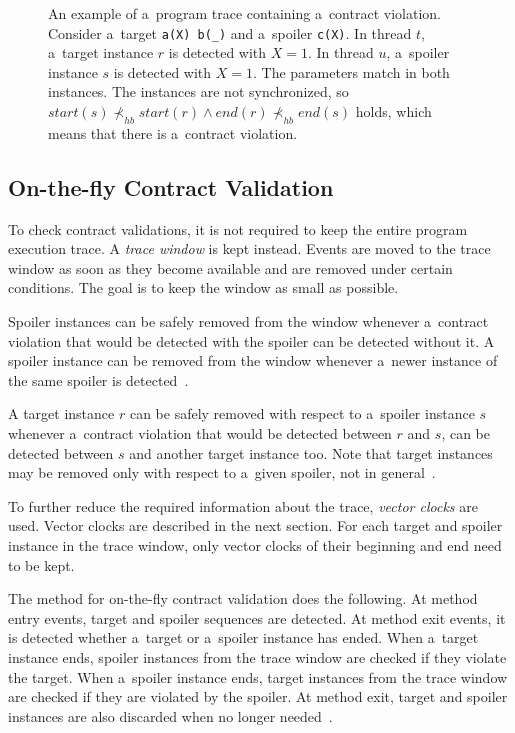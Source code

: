 \begin{figure}[hbt]
    \begin{center}
        \label{traces}
        
        \caption{An example of a~program trace containing a~contract violation.
        Consider a~target \texttt{a(X) b(\_)} and a~spoiler \texttt{c(X)}. In
        thread $t$, a~target instance $r$ is detected with $X=1$. In thread $u$,
        a~spoiler instance $s$ is detected with $X=1$. The parameters match in
        both instances. The instances are not synchronized, so $start(s)
        \nprec_{hb} start(r) \wedge end(r) \nprec_{hb} end(s)$ holds, which
        means that there is a~contract violation.}
    \end{center}
\end{figure}

\subsection{On-the-fly Contract Validation}

To check contract validations, it is not required to keep the entire program
execution trace. A \emph{trace window} is kept instead. Events are moved to the
trace window as soon as they become available and are removed under certain
conditions. The goal is to keep the window as small as possible.

Spoiler instances can be safely removed from the window whenever a~contract
violation that would be detected with the spoiler can be detected without it. A
spoiler instance can be removed from the window whenever a~newer instance of the
same spoiler is detected~\cite{contracts}.

A target instance $r$ can be safely removed with respect to a~spoiler instance
$s$ whenever a~contract violation that would be detected between $r$ and $s$,
can be detected between $s$ and another target instance too. Note that target
instances may be removed only with respect to a~given spoiler, not in
general~\cite{contracts}.

To further reduce the required information about the trace, \emph{vector clocks}
are used. Vector clocks are described in the next section. For each target and
spoiler instance in the trace window, only vector clocks of their beginning and
end need to be kept.

The method for on-the-fly contract validation does the following. At method
entry events, target and spoiler sequences are detected. At method exit events,
it is detected whether a~target or a~spoiler instance has ended. When a~target
instance ends, spoiler instances from the trace window are checked if they
violate the target. When a~spoiler instance ends, target instances from the
trace window are checked if they are violated by the spoiler. At method exit,
target and spoiler instances are also discarded when no longer
needed~\cite{contracts}.

